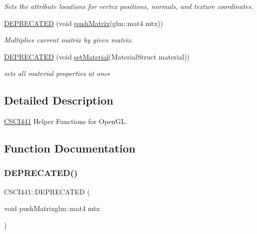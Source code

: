 \begin{DoxyCompactItemize}
\begin{DoxyCompactList}\small\item\em Sets the attribute locations for vertex positions, normals, and texture coordinates. \end{DoxyCompactList}\item 
\hyperlink{namespace_c_s_c_i441_a497b04f17c79e094cc4cce87cdf58262}{D\+E\+P\+R\+E\+C\+A\+T\+ED} (void \hyperlink{namespace_c_s_c_i441_aa818e8189c42c50e88d6d0512274bcfb}{push\+Matrix}(glm\+::mat4 mtx))
\begin{DoxyCompactList}\small\item\em Multiplies current matrix by given matrix. \end{DoxyCompactList}\item 
\hyperlink{namespace_c_s_c_i441_a1b02a3d2b9323127b811be893d7a63e1}{D\+E\+P\+R\+E\+C\+A\+T\+ED} (void \hyperlink{namespace_c_s_c_i441_ac201d649430f0c55e57db10b0dddd100}{set\+Material}(Material\+Struct material))
\begin{DoxyCompactList}\small\item\em sets all material properties at once \end{DoxyCompactList}\end{DoxyCompactItemize}


\subsection{Detailed Description}
\hyperlink{namespace_c_s_c_i441}{C\+S\+C\+I441} Helper Functions for Open\+GL. 

\subsection{Function Documentation}
\mbox{\label{namespace_c_s_c_i441_a497b04f17c79e094cc4cce87cdf58262}} 
\subsubsection{\texorpdfstring{D\+E\+P\+R\+E\+C\+A\+T\+E\+D()}{DEPRECATED()}\hspace{0.1cm}{\footnotesize\ttfamily [1/2]}}
{\footnotesize\ttfamily C\+S\+C\+I441\+::\+D\+E\+P\+R\+E\+C\+A\+T\+ED (\begin{DoxyParamCaption}\item[{void }]{push\+Matrixglm\+::mat4 mtx }\end{DoxyParamCaption})}



